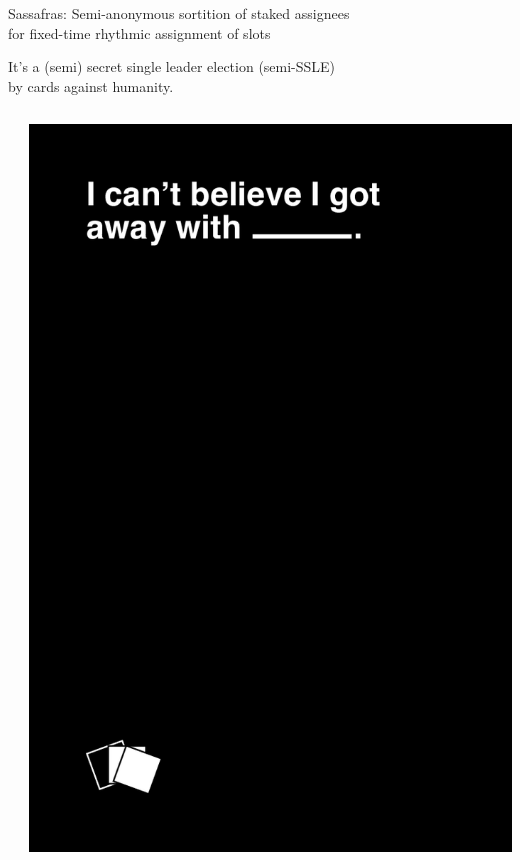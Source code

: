 \documentclass{beamer}
\begin{document}
\begin{frame}

Sassafras: Semi-anonymous sortition of staked assignees \\
\hspace{5pt} for fixed-time rhythmic assignment of slots

\bigskip

It's a (semi) secret single leader election (semi-SSLE) \\
\hspace{5pt} by cards against humanity.

\bigskip


\begin{columns}
	\begin{column}[t]{0.1\textwidth}
	\end{column}
	\begin{column}[t]{0.3\textwidth}
		\includegraphics[width=.9\textwidth]{../images/black_FRONT012.png} %

\end{column}
\end{columns}
\end{frame}
\end{document}
